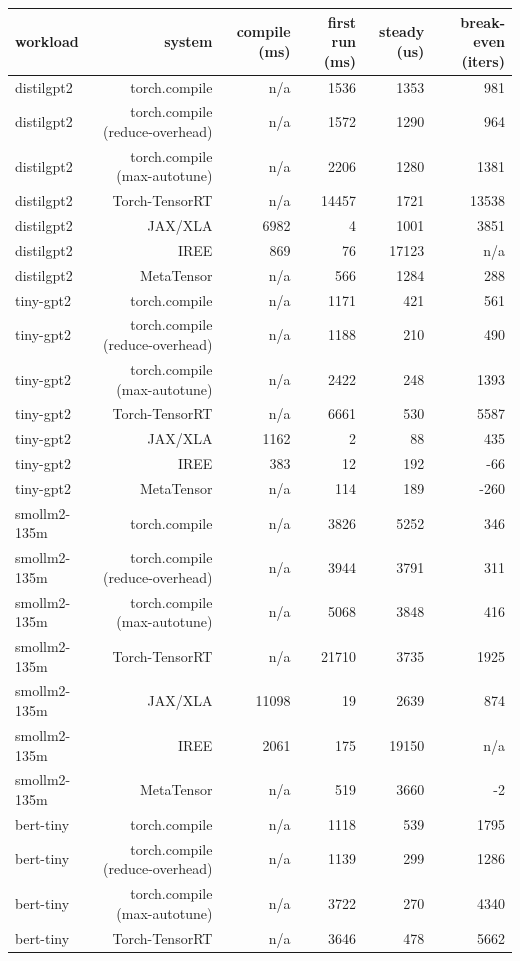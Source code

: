 \begin{tabular}{lrrrrr}
\toprule
workload & system & compile (ms) & first run (ms) & steady (us) & break-even (iters) \\
\midrule
distilgpt2 & torch.compile & n/a & 1536 & 1353 & 981 \\
distilgpt2 & torch.compile (reduce-overhead) & n/a & 1572 & 1290 & 964 \\
distilgpt2 & torch.compile (max-autotune) & n/a & 2206 & 1280 & 1381 \\
distilgpt2 & Torch-TensorRT & n/a & 14457 & 1721 & 13538 \\
distilgpt2 & JAX/XLA & 6982 & 4 & 1001 & 3851 \\
distilgpt2 & IREE & 869 & 76 & 17123 & n/a \\
distilgpt2 & MetaTensor & n/a & 566 & 1284 & 288 \\
tiny-gpt2 & torch.compile & n/a & 1171 & 421 & 561 \\
tiny-gpt2 & torch.compile (reduce-overhead) & n/a & 1188 & 210 & 490 \\
tiny-gpt2 & torch.compile (max-autotune) & n/a & 2422 & 248 & 1393 \\
tiny-gpt2 & Torch-TensorRT & n/a & 6661 & 530 & 5587 \\
tiny-gpt2 & JAX/XLA & 1162 & 2 & 88 & 435 \\
tiny-gpt2 & IREE & 383 & 12 & 192 & -66 \\
tiny-gpt2 & MetaTensor & n/a & 114 & 189 & -260 \\
smollm2-135m & torch.compile & n/a & 3826 & 5252 & 346 \\
smollm2-135m & torch.compile (reduce-overhead) & n/a & 3944 & 3791 & 311 \\
smollm2-135m & torch.compile (max-autotune) & n/a & 5068 & 3848 & 416 \\
smollm2-135m & Torch-TensorRT & n/a & 21710 & 3735 & 1925 \\
smollm2-135m & JAX/XLA & 11098 & 19 & 2639 & 874 \\
smollm2-135m & IREE & 2061 & 175 & 19150 & n/a \\
smollm2-135m & MetaTensor & n/a & 519 & 3660 & -2 \\
bert-tiny & torch.compile & n/a & 1118 & 539 & 1795 \\
bert-tiny & torch.compile (reduce-overhead) & n/a & 1139 & 299 & 1286 \\
bert-tiny & torch.compile (max-autotune) & n/a & 3722 & 270 & 4340 \\
bert-tiny & Torch-TensorRT & n/a & 3646 & 478 & 5662 \\

\end{tabular}
